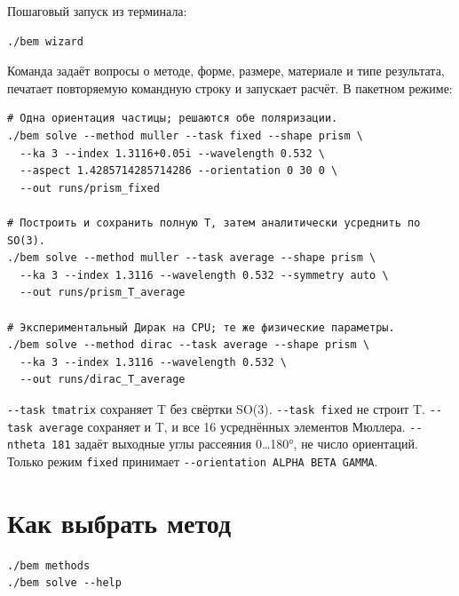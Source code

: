 \documentclass[
  russian,
  11pt,
  a4paper,
]{report}
\begin{document}
Пошаговый запуск из терминала:

\begin{verbatim}
./bem wizard
\end{verbatim}

Команда задаёт вопросы о методе, форме, размере, материале и типе
результата, печатает повторяемую командную строку и запускает расчёт. В
пакетном режиме:

\begin{verbatim}
# Одна ориентация частицы; решаются обе поляризации.
./bem solve --method muller --task fixed --shape prism \
  --ka 3 --index 1.3116+0.05i --wavelength 0.532 \
  --aspect 1.4285714285714286 --orientation 0 30 0 \
  --out runs/prism_fixed

# Построить и сохранить полную T, затем аналитически усреднить по SO(3).
./bem solve --method muller --task average --shape prism \
  --ka 3 --index 1.3116 --wavelength 0.532 --symmetry auto \
  --out runs/prism_T_average

# Экспериментальный Дирак на CPU; те же физические параметры.
./bem solve --method dirac --task average --shape prism \
  --ka 3 --index 1.3116 --wavelength 0.532 \
  --out runs/dirac_T_average
\end{verbatim}

\nolinkurl{--task tmatrix} сохраняет T без свёртки SO(3).
\nolinkurl{--task fixed} не строит T. \nolinkurl{--task average}
сохраняет и T, и все 16 усреднённых элементов Мюллера.
\nolinkurl{--ntheta 181} задаёт выходные углы рассеяния 0\ldots180°, не
число ориентаций. Только режим \nolinkurl{fixed} принимает
\nolinkurl{--orientation ALPHA BETA GAMMA}.

\section{Как выбрать
метод}\label{ux43aux430ux43a-ux432ux44bux431ux440ux430ux442ux44c-ux43cux435ux442ux43eux434}

\begin{verbatim}
./bem methods
./bem solve --help
\end{verbatim}
\end{document}
